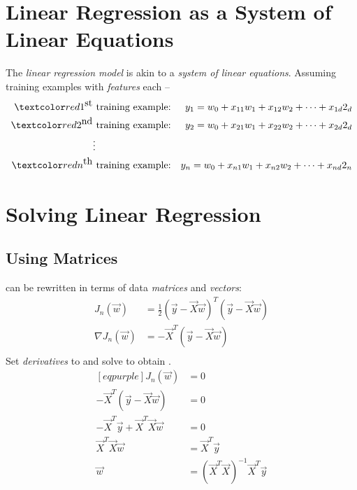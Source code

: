 \documentclass[
	exam={Midterm}
]{cs584exam}
\begin{document}
\section{Linear Regression as a System of Linear Equations}\label{sec:linear-regression-as-a-system-of-linear-equations}
The \emph{linear regression model} is akin to a \emph{system of linear equations}.
Assuming  training examples with  \emph{features} each --
\begin{equation*}
	\begin{aligned}
		\data{1^{\mbox{st}}} & \mbox{ training example:} & y_{1} = w_{0} + x_{11}w_{1} + x_{12}w_{2} + \dots + x_{1d}2_{d}\\
		\data{2^{\mbox{nd}}} & \mbox{ training example:} & y_{2} = w_{0} + x_{21}w_{1} + x_{22}w_{2} + \dots + x_{2d}2_{d}\\
		& \vdots & \\
		\data{n^{\mbox{th}}} & \mbox{ training example:} & y_{n} = w_{0} + x_{n1}w_{1} + x_{n2}w_{2} + \dots + x_{nd}2_{n}\\
	\end{aligned}
\end{equation*}

\section{Solving Linear Regression}\label{sec:solving-linear-regression}
\subsection{Using Matrices}\label{subsec:using-matrices}
 can be rewritten in terms of data \emph{matrices}  and \emph{vectors}:
\begin{equation*}
	\begin{aligned}
		J_{n}(\vec{w}) &= \frac{1}{2}(\vec{y} - \vec{X}\vec{w})^{T}(\vec{y} - \vec{X}\vec{w})\\
		\nabla J_{n}(\vec{w}) &= -\vec{X}^{T}(\vec{y} - \vec{X}\vec{w})\\
	\end{aligned}
\end{equation*}
Set \emph{derivatives} to  and solve to obtain .
\begin{equation*}
	\begin{aligned}[eqpurple]
		J_{n}(\vec{w}) &= 0\\
		-\vec{X}^{T}(\vec{y} - \vec{X}\vec{w}) &= 0\\
		-\vec{X}^{T}\vec{y} + \vec{X}^{T}\vec{X}\vec{w} &= 0\\
		\vec{X}^{T}\vec{X}\vec{w} &= \vec{X}^{T}\vec{y}\\
		\vec{w} &= \left( \vec{X}^{T}\vec{X} \right)^{-1}\vec{X}^{T}\vec{y}\\
	\end{aligned}
\end{equation*}
\end{document}
